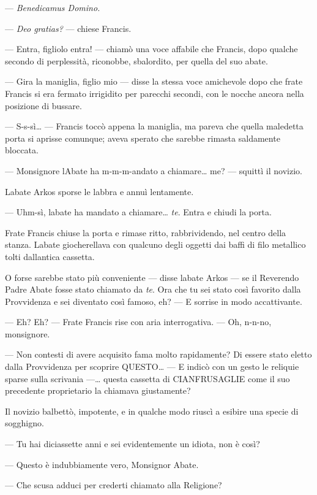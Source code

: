 --- \emph{Benedicamus Domino.}

--- \emph{Deo gratias?} --- chiese Francis.

--- Entra, figliolo entra! --- chiamò una voce affabile che Francis,
dopo qualche secondo di perplessità, riconobbe, sbalordito, per quella
del suo abate.

--- Gira la maniglia, figlio mio --- disse la stessa voce amichevole
dopo che frate Francis si era fermato irrigidito per parecchi secondi,
con le nocche ancora nella posizione di bussare.

--- S-s-sì\ldots{} --- Francis toccò appena la maniglia, ma pareva che
quella maledetta porta si aprisse comunque; aveva sperato che sarebbe
rimasta saldamente bloccata.

--- Monsignore l\textquotesingle Abate ha m-m-m-andato a
chiamare\ldots{} me? --- squittì il novizio.

L\textquotesingle abate Arkos sporse le labbra e annuì lentamente.

--- Uhm-sì, l\textquotesingle abate ha mandato a chiamare\ldots{}
\emph{te}. Entra e chiudi la porta.

Frate Francis chiuse la porta e rimase ritto, rabbrividendo, nel centro
della stanza. L\textquotesingle abate giocherellava con qualcuno degli
oggetti dai baffi di filo metallico tolti dall\textquotesingle antica
cassetta.

O forse sarebbe stato più conveniente --- disse l\textquotesingle abate
Arkos --- se il Reverendo Padre Abate fosse stato chiamato da \emph{te}.
Ora che tu sei stato così favorito dalla Provvidenza e sei diventato
così famoso, eh? --- E sorrise in modo accattivante.

--- Eh? Eh? --- Frate Francis rise con aria interrogativa. --- Oh,
n-n-no, monsignore.

--- Non contesti di avere acquisito fama molto rapidamente? Di essere
stato eletto dalla Provvidenza per scoprire QUESTO\ldots{} --- E indicò
con un gesto le reliquie sparse sulla scrivania ---\ldots{} questa
cassetta di CIANFRUSAGLIE come il suo precedente proprietario la
chiamava giustamente?

Il novizio balbettò, impotente, e in qualche modo riuscì a esibire una
specie di sogghigno.

--- Tu hai diciassette anni e sei evidentemente un idiota, non è così?

--- Questo è indubbiamente vero, Monsignor Abate.

--- Che scusa adduci per crederti chiamato alla Religione?

